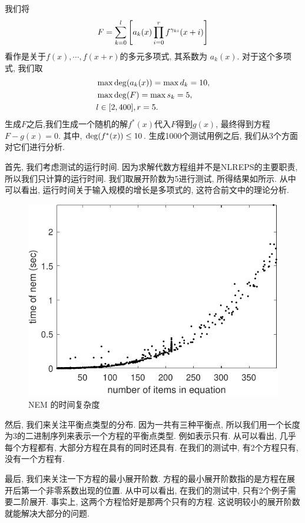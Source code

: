 我们将 
\begin{equation}
    F=\sum_{k=0}^l{\left[a_k(x)\prod_{i=0}^r{f^{\gamma_{ki}}(x+i)}\right]}
\end{equation}
看作是关于$f(x),\cdots,f(x+r)$的多元多项式, 其系数为 $a_k(x)$. 对于这个多项式, 我们取
\begin{equation}
\begin{split}
&\max{\rm deg}(a_k(x))=\max d_k=10,\\ 
&\max{\rm deg}(F)=\max s_k=5, \\
&l\in [2,400], r=5.
\end{split}
\end{equation}
生成$F$之后,我们生成一个随机的解$f^*(x)$代入$F$得到$g(x)$, 最终得到方程$F-g(x)=0$. 其中, ${\rm deg}(f^*(x))\le 10$. 生成1000个测试用例之后, 我们从3个方面对它们进行分析. 

首先, 我们考虑测试的运行时间. 因为求解代数方程组并不是NLREPS的主要职责, 所以我们只计算的运行时间. 我们取展开阶数为5进行测试, 所得结果如所示. 从中可以看出, 运行时间关于输入规模的增长是多项式的, 这符合前文中的理论分析. 
\begin{figure}[htbp]
\centering
\includegraphics[width=.7\textwidth]{fig/t-nem.pdf}
\caption{NEM 的时间复杂度}
\label{t-nem}
\end{figure}

然后, 我们来关注平衡点类型的分布. 因为一共有三种平衡点, 所以我们用一个长度为3的二进制序列来表示一个方程的平衡点类型. 例如表示只有\BPone{}. 从可以看出, 几乎每个方程都有\BPone{}, 大部分方程在具有\BPone{}的同时还具有\BPthree{}. 在我们的测试中, 有2个方程只有\BPthree{}, 没有一个方程有\BPtwo{}.


最后, 我们来关注一下方程的最小展开阶数. 方程的最小展开阶数指的是方程在展开后第一个非零系数出现的位置. 从中可以看出, 在我们的测试中, 只有2个例子需要二阶展开. 事实上, 这两个方程恰好是那两个只有\BPthree{}的方程. 这说明较小的展开阶数就能解决大部分的问题. 

